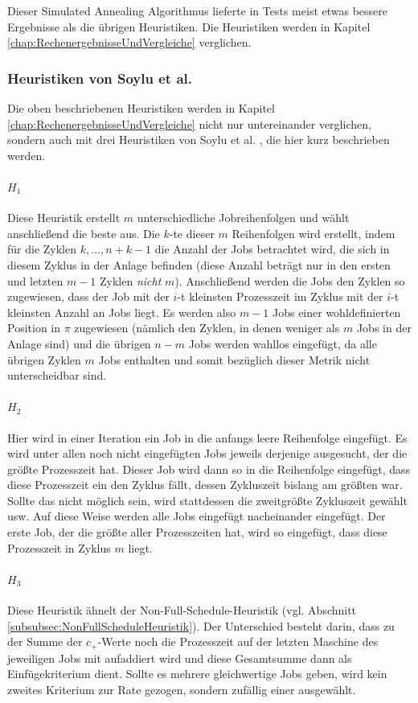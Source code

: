 \documentclass{scrreprt}
\begin{document}
Dieser Simulated Annealing Algorithmus lieferte in Tests meist etwas bessere Ergebnisse als die übrigen Heuristiken.
Die Heuristiken werden in Kapitel \ref{chap:RechenergebnisseUndVergleiche} verglichen.

\subsubsection{Heuristiken von Soylu et al.}
Die oben beschriebenen Heuristiken werden in Kapitel \ref{chap:RechenergebnisseUndVergleiche} nicht nur untereinander verglichen, 
sondern auch mit drei Heuristiken von Soylu et al. \cite{soylu}, die hier kurz beschrieben werden.

\paragraph{$H_1$}
Diese Heuristik erstellt $m$ unterschiedliche Jobreihenfolgen und wählt anschließend die beste aus.
Die $k$-te dieser $m$ Reihenfolgen wird erstellt, indem für die Zyklen $k,\ldots,n+k-1$ die Anzahl der Jobs betrachtet wird,
die sich in diesem Zyklus in der Anlage befinden (diese Anzahl beträgt nur in den ersten und letzten $m-1$ Zyklen \textit{nicht} $m$).
Anschließend werden die Jobs den Zyklen so zugewiesen, dass der Job mit der $i$-t kleinsten Prozesszeit im Zyklus mit der $i$-t kleinsten Anzahl an Jobs liegt.
Es werden also $m-1$ Jobs einer wohldefinierten Position in $\pi$ zugewiesen (nämlich den Zyklen, in denen weniger als $m$ Jobs in der Anlage sind) 
und die übrigen $n-m$ Jobs werden wahllos eingefügt, da alle übrigen Zyklen $m$ Jobs enthalten und somit bezüglich dieser Metrik nicht unterscheidbar sind.

\paragraph{$H_2$}
Hier wird in einer Iteration ein Job in die anfangs leere Reihenfolge eingefügt.
Es wird unter allen noch nicht eingefügten Jobs jeweils derjenige ausgesucht, der die größte Prozesszeit hat.
Dieser Job wird dann so in die Reihenfolge eingefügt, dass diese Prozesszeit ein den Zyklus fällt, dessen Zykluszeit bislang am größten war.
Sollte das nicht möglich sein, wird stattdessen die zweitgrößte Zykluszeit gewählt usw.
Auf diese Weise werden alle Jobs eingefügt nacheinander eingefügt. 
Der erste Job, der die größte aller Prozesszeiten hat, wird so eingefügt, dass diese Prozesszeit in Zyklus $m$ liegt.

\paragraph{$H_3$}
Diese Heuristik ähnelt der Non-Full-Schedule-Heuristik (vgl. Abschnitt \ref{subsubsec:NonFullScheduleHeuristik}).
Der Unterschied besteht darin, dass zu der Summe der $c_+$-Werte noch die Prozesszeit auf der letzten Maschine des jeweiligen Jobs mit aufaddiert wird
und diese Gesamtsumme dann als Einfügekriterium dient.
Sollte es mehrere gleichwertige Jobs geben, wird kein zweites Kriterium zur Rate gezogen, sondern zufällig einer ausgewählt.
\end{document}
